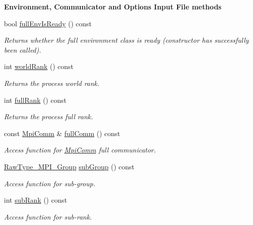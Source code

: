 \begin{Indent}{\bf Environment, Communicator and Options Input File methods}\par
\begin{DoxyCompactItemize}
\item 
bool \hyperlink{class_q_u_e_s_o_1_1_base_environment_a0d01d2b909218edb38f19f908efac82f}{full\-Env\-Is\-Ready} () const 
\begin{DoxyCompactList}\small\item\em Returns whether the full environment class is ready (constructor has successfully been called). \end{DoxyCompactList}\item 
int \hyperlink{class_q_u_e_s_o_1_1_base_environment_a78b57112bbd0e6dd0e8afec00b40ffa7}{world\-Rank} () const 
\begin{DoxyCompactList}\small\item\em Returns the process world rank. \end{DoxyCompactList}\item 
int \hyperlink{class_q_u_e_s_o_1_1_base_environment_a84a239e42ae443cf71db6e03e8159620}{full\-Rank} () const 
\begin{DoxyCompactList}\small\item\em Returns the process full rank. \end{DoxyCompactList}\item 
const \hyperlink{class_q_u_e_s_o_1_1_mpi_comm}{Mpi\-Comm} \& \hyperlink{class_q_u_e_s_o_1_1_base_environment_a0b0779b41ff304058856e97e1d16b4d4}{full\-Comm} () const 
\begin{DoxyCompactList}\small\item\em Access function for \hyperlink{class_q_u_e_s_o_1_1_mpi_comm}{Mpi\-Comm} full communicator. \end{DoxyCompactList}\item 
\hyperlink{namespace_q_u_e_s_o_acbf5b0ed9be4b77acd471b3914e128c6}{Raw\-Type\-\_\-\-M\-P\-I\-\_\-\-Group} \hyperlink{class_q_u_e_s_o_1_1_base_environment_a6427d9f94e145748d0d27e5c62f511fa}{sub\-Group} () const 
\begin{DoxyCompactList}\small\item\em Access function for sub-\/group. \end{DoxyCompactList}\item 
int \hyperlink{class_q_u_e_s_o_1_1_base_environment_a172d52f993f1322ed45aaddf71518dbb}{sub\-Rank} () const 
\begin{DoxyCompactList}\small\item\em Access function for sub-\/rank. \end{DoxyCompactList}\item 

\end{DoxyCompactItemize}
\end{Indent}
